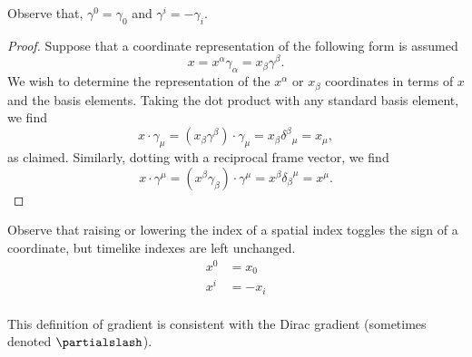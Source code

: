 Observe that, \( \gamma^0 = \gamma_0 \) and \( \gamma^i = -\gamma_i \).
\begin{proof}
Suppose that a coordinate representation of the following form is assumed
\begin{equation}\label{eqn:lorentzForceCovariant:820}
x = x^\alpha \gamma_\alpha = x_\beta \gamma^\beta.
\end{equation}
We wish to determine the representation of the \( x^\alpha \) or \( x_\beta \) coordinates in terms of \( x\) and the basis elements.  Taking the dot product with any standard basis element, we find
\begin{dmath}\label{eqn:lorentzForceCovariant:840}
x \cdot \gamma_\mu
= (x_\beta \gamma^\beta) \cdot \gamma_\mu
= x_\beta {\delta^\beta}_\mu
= x_\mu,
\end{dmath}
as claimed.  Similarly, dotting with a reciprocal frame vector, we find
\begin{dmath}\label{eqn:lorentzForceCovariant:860}
x \cdot \gamma^\mu
= (x^\beta \gamma_\beta) \cdot \gamma^\mu
= x^\beta {\delta_\beta}^\mu
= x^\mu.
\end{dmath}
\end{proof}
Observe that raising or lowering the index of a spatial index toggles the sign of a coordinate, but timelike indexes are left unchanged.
\begin{equation}\label{eqn:lorentzForceCovariant:880}
\begin{aligned}
x^0 &= x_0 \\
x^i &= -x_i \\
\end{aligned}
\end{equation}

This definition of gradient is consistent with the Dirac gradient (sometimes denoted \(\partialslash\)).
%

